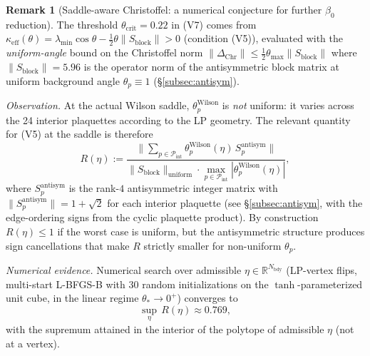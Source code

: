 \documentclass[11pt]{article}
\theoremstyle{definition}
\newtheorem{remark}[theorem]{Remark}
\newcommand{\R}{\mathbb{R}}
\begin{document}
\begin{remark}[Saddle-aware Christoffel: a numerical conjecture for further $\beta_0$ reduction]
\label{rem:saddle-aware-conjecture}
The threshold $\theta_{\mathrm{crit}}=0.22$ in (V7) comes from
$\kappa_{\mathrm{eff}}(\theta)=\lambda_{\min}\cos\theta-\tfrac{1}{2}\theta\|S_{\mathrm{block}}\|>0$
\textup{(}condition (V5)\textup{)}, evaluated with the
\emph{uniform-angle} bound on the Christoffel norm
$\|\Delta_{\mathrm{Chr}}\|\le\tfrac{1}{2}\theta_{\max}\|S_{\mathrm{block}}\|$
where $\|S_{\mathrm{block}}\|=5.96$ is the operator norm of the
antisymmetric block matrix at uniform background angle $\theta_p\equiv 1$
\textup{(}\S\ref{subsec:antisym}\textup{)}.

\emph{Observation.}  At the actual Wilson saddle, $\theta_p^{\mathrm{Wilson}}$
is \emph{not} uniform: it varies across the 24 interior plaquettes
according to the LP geometry.  The relevant quantity for (V5) at the
saddle is therefore
\[
R(\eta):=\frac{\bigl\|\sum_{p\in\mathcal P_{\mathrm{int}}}\theta_p^{\mathrm{Wilson}}(\eta)\,S_p^{\mathrm{antisym}}\bigr\|}
{\|S_{\mathrm{block}}\|_{\mathrm{uniform}}\cdot\max_{p\in\mathcal P_{\mathrm{int}}}|\theta_p^{\mathrm{Wilson}}(\eta)|},
\]
where $S_p^{\mathrm{antisym}}$ is the rank-$4$ antisymmetric integer
matrix with $\|S_p^{\mathrm{antisym}}\|=1+\sqrt 2$ for each interior
plaquette \textup{(}see \S\ref{subsec:antisym}, with the
edge-ordering signs from the cyclic plaquette product\textup{)}.  By
construction $R(\eta)\le 1$ if the worst case is uniform, but the
antisymmetric structure produces sign cancellations that make $R$
strictly smaller for non-uniform $\theta_p$.

\emph{Numerical evidence.}  Numerical search over admissible
$\eta\in\R^{N_{\mathrm{bdy}}}$ \textup{(}LP-vertex flips, multi-start
L-BFGS-B with $30$ random initializations on the $\tanh$-parameterized
unit cube, in the linear regime $\theta_*\to 0^+$\textup{)} converges
to
\[
\sup_{\eta}\,R(\eta)\approx 0.769,
\]
with the supremum attained in the interior of the polytope of
admissible $\eta$ \textup{(}not at a vertex\textup{)}.


\end{remark}
\end{document}
